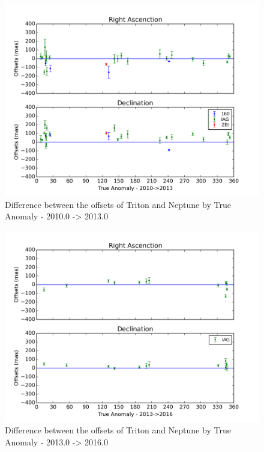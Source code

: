 \documentclass[12pt,a4paper]{report}
\begin{document}
\begin{figure}
\includegraphics[width=14.0cm]{Anom_TN_2010-2013.png} 
\caption{Difference between the offsets of Triton and Neptune by True Anomaly - 2010.0 -> 2013.0}
\label{Fig:triton-netuno-2010}
\end{figure}
\begin{figure}
\includegraphics[width=14.0cm]{Anom_TN_2013-2016.png} 
\caption{Difference between the offsets of Triton and Neptune by True Anomaly - 2013.0 -> 2016.0}
\label{Fig:triton-netuno-2013}
\end{figure}




\end{document}
